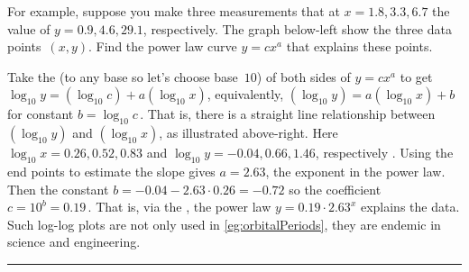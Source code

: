 \begin{table}
\begin{minipage}{\linewidth}
For example, suppose you make three measurements that at $x=1.8,3.3,6.7$ the value of $y=0.9,4.6,29.1$, respectively.  
The graph below-left show the three data points~$(x,y)$.  
Find the power law curve $y=cx^a$ that explains these points.
\begin{center} 
 \hfil
{} 
\end{center}
Take the  (to any base so let's choose base~$10$) of both sides of $y=cx^a$ to get $\log_{10} y=(\log_{10} c)+a(\log_{10} x)$, equivalently, $(\log_{10} y)=a(\log_{10} x)+b$ for constant $b=\log_{10} c$\,.
That is, there is a straight line relationship between $(\log_{10} y)$ and $(\log_{10} x)$, as illustrated above-right.
Here $\log_{10}x=0.26,0.52,0.83$ and $\log_{10}y=-0.04,0.66,1.46$, respectively \twodp.
Using the end points to estimate the slope gives $a=2.63$, the exponent in the power law.
Then the constant $b=-0.04-2.63\cdot0.26=-0.72$ so the coefficient $c=10^b=0.19$\,.
That is, via the , the power law $y=0.19\cdot 2.63^x$ explains the data.
Such log-log plots are not only used in \cref{eg:orbitalPeriods}, they are endemic in science and engineering.
\end{minipage}
\hrule
\end{table}





